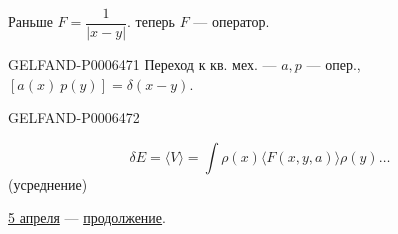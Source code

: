 Раньше \(F=\dfrac1{|x-y|}\).
теперь \(F\) --- оператор.


\begin{GelfandAdjacentEvidence}{GELFAND-P000647}{1}
Переход к кв. мех. --- \(a,p\) --- опер.,
\(\left[a(x)\ p(y)\right]=\delta(x-y)\).
\end{GelfandAdjacentEvidence}
\begin{GelfandAdjacentEvidence}{GELFAND-P000647}{2}


\[
\delta E=\langle V\rangle=\int\rho(x)\langle F(x,y,a)\rangle\rho(y)\ldots
\]
(усреднение)
\end{GelfandAdjacentEvidence}


\underline{5 апреля} --- \underline{продолжение}.


